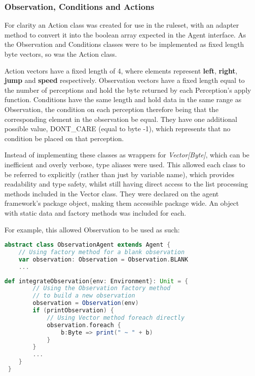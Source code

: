 \subsubsection{Observation, Conditions and Actions}

For clarity an Action class was created for use in the ruleset, with an adapter method to convert it into the boolean array expected in the Agent interface. As the Observation and Conditions classes were to be implemented as fixed length byte vectors, so was the Action class.

Action vectors have a fixed length of 4, where elements represent \textbf{left}, \textbf{right}, \textbf{jump} and \textbf{speed} respectively. Observation vectors have a fixed length equal to the number of perceptions and hold the byte returned by each Perception's apply function. Conditions have the same length and hold data in the same range as Observation, the condition on each perception therefore being that the corresponding element in the observation be equal. They have one additional possible value, {\footnotesize DONT\_CARE} (equal to byte -1), which represents that no condition be placed on that perception.

Instead of implementing these classes as wrappers for \emph{Vector[Byte]}, which can be inefficient and overly verbose, type aliases were used. This allowed each class to be referred to explicitly (rather than just by variable name), which provides readability and type safety, whilst still having direct access to the list processing methods included in the Vector class. They were declared on the agent framework's package object, making them accessible package wide. An object with static data and factory methods was included for each.

For example, this allowed Observation to be used as such:

\begin{minipage}{0.9\linewidth}
\centering
\begin{lstlisting}[language=scala]
abstract class ObservationAgent extends Agent {
    // Using factory method for a blank observation
    var observation: Observation = Observation.BLANK
    ...
\end{lstlisting}
\end{minipage}

\begin{minipage}{0.9\linewidth}
\centering
\begin{lstlisting}[language=scala]
    def integrateObservation{env: Environment}: Unit = {
        // Using the Observation factory method 
        // to build a new observation
        observation = Observation(env)
        if (printObservation) {
            // Using Vector method foreach directly
            observation.foreach { 
                b:Byte => print(" ~ " + b)
            }
        }
        ...
    }
 }
\end{lstlisting}
\end{minipage}


